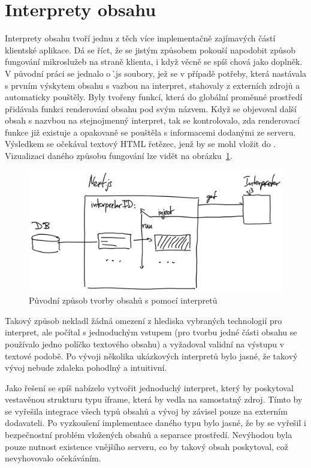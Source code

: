 \section{Interprety obsahu}\label{sec:client-interpret}

Interprety obsahu tvoří jednu z těch více implementačně zajímavých částí klientské aplikace.
Dá se říct, že se jistým způsobem pokouší napodobit způsob fungování mikroslužeb na straně klienta, i když věcně se spíš chová jako doplněk.
V původní práci se jednalo o \h{.js} soubory, jež se v případě potřeby, která nastávala s prvním výskytem obsahu s vazbou na interpret, stahovaly z externích zdrojů a automaticky pouštěly.
Byly tvořeny  funkcí, která do globální proměnné prostředí přidávala funkci renderování obsahu pod svým názvem.
Když se objevoval další obsah s nazvbou na stejnojmenný interpret, tak se kontrolovalo, zda renderovací funkce již existuje a opakovaně se pouštěla s informacemi dodanými ze serveru.
Výsledkem se očekával textový HTML řetězec, jenž by se mohl vložit do .
Vizualizaci daného způsobu fungování lze vidět na obrázku~\ref{fig:client-interpreter-old}.

\begin{figure}[htbp]
   \centering
   \includegraphics[max width=\textwidth]{assets/draft-interpreters}
   \caption{Původní způsob tvorby obsahů s pomocí interpretů}\label{fig:client-interpreter-old}
\end{figure}


Takový způsob nekladl žádná omezení z hlediska vybraných technologií pro interpret, ale počítal s jednoduchým vstupem (pro tvorbu jedné části obsahu se používalo jedno políčko textového obsahu) a vyžadoval validní  na výstupu v textové podobě.
Po vývoji několika ukázkových interpretů bylo jasné, že takový vývoj nebude zdaleka pohodlný a intuitivní.

Jako řešení se spíš nabízelo vytvořit jednoduchý interpret, který by poskytoval vestavěnou strukturu typu \h{iframe}, která by vedla na samostatný zdroj.
Tímto by se vyřešila integrace všech typů obsahů a vývoj by závisel pouze na externím dodavateli.
Po vyzkoušení implementace daného typu bylo jasné, že by se vyřešil i bezpečnostní problém vložených obsahů a separace prostředí.
Nevýhodou byla pouze nutnost existence vnějšího serveru, co by takový obsah poskytoval, což nevyhovovalo očekáváním.

